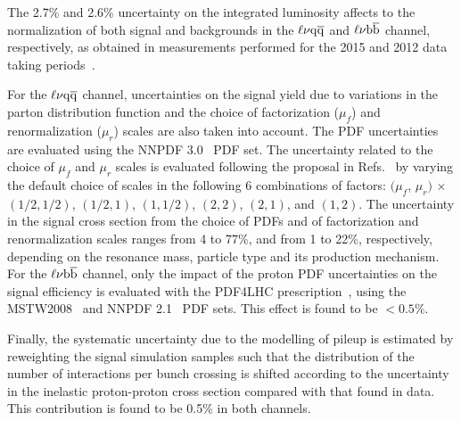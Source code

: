 The 2.7\% and 2.6\% uncertainty on the integrated luminosity affects to the normalization of both signal and backgrounds in the $\ell\nu\mathrm{q}\overline{\mathrm{q}}$ and $\ell\nu{\mathrm{b}\overline{\mathrm{b}}}$ channel, respectively, as obtained in measurements performed for the 2015 and 2012 data taking periods~\cite{CMS-PAS-LUM-15-001,CMS:LUM13001}. 

For the $\ell\nu\mathrm{q}\overline{\mathrm{q}}$ channel, uncertainties on the signal yield due to variations in the parton distribution function and the choice of factorization ($\mu_{f}$) and renormalization ($\mu_{r}$) scales are also taken into account.
The PDF uncertainties are evaluated using the NNPDF 3.0~\cite{Ball:2011mu} PDF set.
The uncertainty related to the choice of $\mu_{f}$ and $\mu_{r}$ scales is evaluated following the proposal in Refs.~\cite{Cacciari:2003fi,Catani:2003zt} by varying the default choice of scales in the following 6 combinations of factors:
$(\mu_{f}$, $\mu_{r})$ $\times$ $(1/2, 1/2)$, $(1/2, 1)$, $(1,1/2)$, $(2, 2)$, $(2, 1)$, and $(1, 2)$.
The uncertainty in the signal cross section from the choice of PDFs and of factorization and renormalization scales ranges from 4 to 77\%, and from 1 to 22\%, respectively, depending on the resonance mass, particle type and its production mechanism.
For the $\ell\nu{\mathrm{b}\overline{\mathrm{b}}}$ channel, only the impact of the proton PDF uncertainties on the signal efficiency is evaluated with the PDF4LHC prescription~\cite{Botje:2011sn,Alekhin:2011sk}, using the MSTW2008~\cite{MSTW} and NNPDF 2.1~\cite{NNPDF} PDF sets. This effect is found to be $< 0.5\%$.

Finally, the systematic uncertainty due to the modelling of pileup is estimated by reweighting the signal simulation samples such that the distribution of the number of interactions per bunch crossing is shifted according to the uncertainty in the inelastic proton-proton cross section compared with that found in data. This contribution is found to be 0.5\% in both channels.

